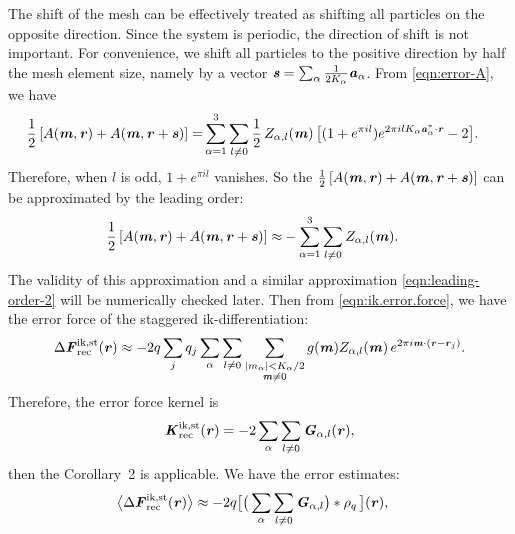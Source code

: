 \documentclass[journal=jacsat,manuscript=article]{achemso}
\newcommand{\recheck}[1]{{\color{black} #1}}
\renewcommand{\v}[1]{\textbf{\textit{#1}}}
\begin{document}
The shift of the mesh can be effectively treated as shifting all
particles on the opposite direction. Since the system is periodic,
the direction of shift is not important. For convenience, we shift
all particles to the positive direction by half the mesh element size, namely
by a vector $\v s = \sum_\alpha\frac1{2K_\alpha}\v a_\alpha$. From
\ref{eqn:error-A}, we have
\begin{align}
  \frac12\, [A(\v m, \v r) + A(\v m, \v r+\v s)]
  =&
  \sum_{\alpha=1}^3\sum_{l\neq 0}
  \frac12\,
  Z_{\alpha,l}(\v m)\,
  \big[
  (1 + e^{\pi i l})e^{2\pi i l K_\alpha\v a^\ast_\alpha\cdot \v r} - 2
  \big].
\end{align}
Therefore, when $l$ is odd, $1 + e^{\pi i l}$ vanishes. So the $\frac12\,[A(\v
m, \v r) + A(\v m, \v r+\v s)]$ can be approximated by the leading
order:
\begin{align}\label{eqn:leading-order-1}
  \frac12\, [A(\v m, \v r) + A(\v m, \v r+\v s)]
  \approx&
  -\sum_{\alpha=1}^3\sum_{l\neq 0}
  Z_{\alpha,l}(\v m).
\end{align}
\recheck{The validity of this approximation and a similar approximation
  \ref{eqn:leading-order-2}
  will be numerically checked later.}
Then from \ref{eqn:ik.error.force}, we have the error force of
the staggered ik-differentiation:
\begin{align}\label{eqn:ik-st-error-force}
  \Delta\v F^{\textrm{ik,st}}_{\textrm{rec}}(\v r)
  \approx -2q
  \sum_jq_j
  \sum_\alpha\sum_{l\neq 0}
  \sum_{
    \begin{subarray}{c}
      \vert m_{\alpha}\vert < K_\alpha/2\\
      \v m\neq 0
    \end{subarray}}
  g(\v m) Z_{\alpha,l}(\v m)\,e^{2\pi i\v m\cdot(\v r-\v r_j)}.
\end{align}
Therefore, the error force kernel is
\begin{align}
  \v K^{\textrm{ik,st}}_{\textrm{rec}}(\v r)
  = -2
  \sum_\alpha\sum_{l\neq 0}\v G_{\alpha,l}(\v r),
\end{align}
then the
Corollary~2
is applicable.
We have the error estimates:
\begin{align}\label{eqn:ik.st.meanf}
  \big\langle
  \Delta\v F_{\textrm{rec}}^{\textrm{ik,st}}(\v r)
  \big\rangle
  & \approx
  - 2 q
  \big[
  \big(
  \sum_{\alpha}\sum_{l\neq 0}\v G_{\alpha,l}
  \big)
  \ast\rho_q\,
  \big] (\v r),
\end{align}
\end{document}
